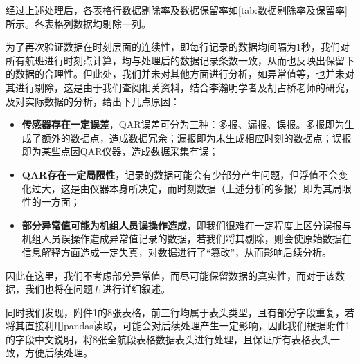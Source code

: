 \documentclass{MathorCupModeling}
\begin{document}
	经过上述处理后，各表格行数据剔除率及数据保留率如\textcolor{blue}{\cref{tab:数据剔除率及保留率}}所示。各表格列数据均剔除一列。
\begin{table}[H]
	\centering
	\caption{附件1各表格数据剔除、保留率（名称省略年份2014）}
	\label{tab:数据剔除率及保留率}
\end{table}
	为了再次验证数据在时刻层面的连续性，即每行记录的数据均间隔为1秒，我们对所有航班进行时刻点计算，均与处理后的数据记录条数一致，从而也反映出保留下的数据的合理性。但此处，我们并未对其他方面进行分析，如异常值等，也并未对其进行剔除，这是由于我们查阅相关资料，结合李瀚明\textcolor{blue}{\cite{Paper:李瀚明}}学者及胡占桥\textcolor{blue}{\cite{Paper:胡占桥}}老师的研究，及对实际数据的分析，给出下几点原因：\begin{itemize}
		\item \textbf{传感器存在一定误差}，QAR误差可分为三种：多报、漏报、误报。多报即为生成了额外的数据点，造成数据冗余；漏报即为未生成相应时刻的数据点；误报即为某些点因QAR仪器，造成数据采集有误；
		\item \textbf{QAR存在一定局限性}，记录的数据可能会有少部分产生问题，但浮值不会变化过大，这是由仪器本身所决定，而时刻数据（上述分析的多报）即为其局限性的一方面；
		\item \textbf{部分异常值可能为机组人员误操作造成}，即我们很难在一定程度上区分误报与机组人员误操作造成异常值记录的数据，若我们将其剔除，则会使原始数据在信息解释方面造成一定失真，对数据进行了“篡改”，从而影响后续分析。
	\end{itemize}
	因此在这里，我们不考虑部分异常值，而尽可能保留数据的真实性，而对于该数据，我们也将在问题五进行详细叙述。

	同时我们发现，附件1的8张表格，前三行均属于表头类型，且有部分字段重复，若将其直接利用pandas读取，可能会对后续处理产生一定影响，因此我们根据附件1的字段中文说明，将8张全航段表格数据表头进行处理，且保证所有表格表头一致，方便后续处理。
\end{document}
